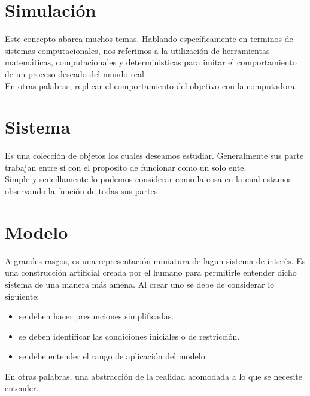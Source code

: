 \documentclass[letterpaper, 12pt]{article}
\begin{document}
    \newpage
    \begin{justify}
        \setcounter{page}{1}
        \thispagestyle{fancy}
        \section*{Simulación}
        \justify
        Este concepto abarca muchos temas. Hablando específicamente en terminos de sistemas computacionales, nos referimos
        a la utilización de herramientas matemáticas, computacionales y deterministicas para imitar el comportamiento de un proceso deseado del mundo real.
        \\\newline
        En otras palabras, replicar el comportamiento del objetivo con la computadora.
        \section*{Sistema}
        \justify
        Es una colección de objetos los cuales deseamos estudiar. Generalmente sus parte trabajan entre sí con el proposito de funcionar como un solo ente.
        \\\newline
        Simple y sencillamente lo podemos considerar como la cosa en la cual estamos observando la función de todas sus partes.
        \section*{Modelo}
        \justify
        A grandes rasgos, es una representación miniatura de lagun sistema de interés. Es una construcción artificial creada por el humano para permitirle entender 
        dicho sistema de una manera más amena. Al crear uno se debe de considerar lo siguiente:
        \begin{itemize}
            \item se deben hacer presunciones simplificadas.
            \item se deben identificar las condiciones iniciales o de restricción.
            \item se debe entender el rango de aplicación del modelo.
        \end{itemize}
        En otras palabras, una abstracción de la realidad acomodada a lo que se necesite entender.

\end{justify}
\end{document}
